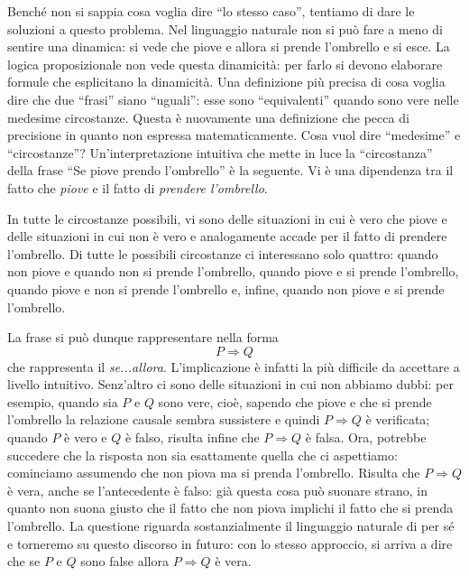 Benché non si sappia cosa voglia dire ``lo stesso caso'', tentiamo di dare le soluzioni 
a questo problema. Nel linguaggio naturale non si può fare a meno di sentire 
una dinamica: si vede che piove e allora si prende l'ombrello e si esce. La logica 
proposizionale non vede questa dinamicità: per farlo si devono elaborare formule 
che esplicitano la dinamicità. Una definizione più precisa di cosa voglia dire 
che due ``frasi'' siano ``uguali'': esse sono ``equivalenti'' quando sono 
vere nelle medesime circostanze. Questa è nuovamente una definizione che pecca 
di precisione in quanto non espressa matematicamente. Cosa vuol dire ``medesime'' 
e ``circostanze''? Un'interpretazione intuitiva che mette in luce la 
``circostanza'' della frase ``Se piove prendo l'ombrello'' è la seguente. Vi 
è una dipendenza tra il fatto che \textit{piove} e il fatto di \textit{prendere 
l'ombrello}. 

In tutte le circostanze possibili, vi sono delle situazioni in cui 
è vero che piove e delle situazioni in cui non è vero e analogamente 
accade per il fatto di prendere l'ombrello. 
Di tutte le possibili circostanze ci interessano 
solo quattro: quando non piove e quando non si prende l'ombrello, quando piove 
e si prende l'ombrello, quando piove e non si prende l'ombrello e, infine, 
quando non piove e si prende l'ombrello. 
 
La frase si può dunque rappresentare nella forma 
$$
P \Rightarrow Q
$$
che rappresenta il \textit{se...allora}. L'implicazione è infatti la più 
difficile da accettare a livello intuitivo. Senz'altro ci sono delle situazioni 
in cui non abbiamo dubbi: per esempio, quando sia $P$ e $Q$ sono vere, cioè, 
sapendo che piove e che si prende l'ombrello la relazione causale sembra sussistere 
e quindi $P \Rightarrow Q$ è verificata; quando $P$ è vero e $Q$ è falso,
risulta infine che $P \Rightarrow Q$ è falsa. Ora, potrebbe succedere che 
la risposta non sia esattamente quella che ci aspettiamo: cominciamo assumendo 
che non piova ma si prenda l'ombrello. Risulta che $P \Rightarrow Q$ è vera, 
anche se l'antecedente è falso: già questa cosa può suonare strano, in quanto 
non suona giusto che il fatto che non piova implichi il fatto che si prenda l'ombrello. 
La questione riguarda sostanzialmente il linguaggio naturale di per sé e torneremo 
su questo discorso in futuro: con lo stesso approccio, si arriva a dire che se 
$P$ e $Q$ sono false allora $P \Rightarrow Q$ è vera. 

